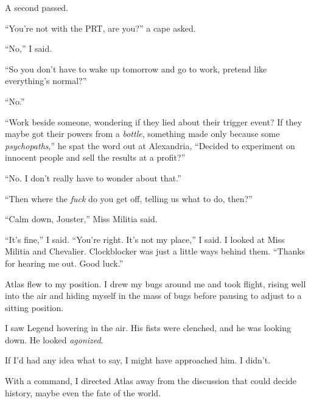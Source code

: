 A second passed.



``You're not with the PRT, are you?'' a cape asked.



``No,'' I said.



``So you don't have to wake up tomorrow and go to work, pretend like everything's normal?''



``No.''



``Work beside someone, wondering if they lied about their trigger event?  If they maybe got their powers from a \emph{bottle}, something made only because some \emph{psychopaths},'' he spat the word out at Alexandria, ``Decided to experiment on innocent people and sell the results at a profit?''



``No.  I don't really have to wonder about that.''



``Then where the \emph{fuck} do you get off, telling us what to do, then?''



``Calm down, Jouster,'' Miss Militia said.



``It's fine,'' I said.  ``You're right.  It's not my place,'' I said.  I looked at Miss Militia and Chevalier.  Clockblocker was just a little ways behind them.  ``Thanks for hearing me out.  Good luck.''



Atlas flew to my position.  I drew my bugs around me and took flight, rising well into the air and hiding myself in the mass of bugs before pausing to adjust to a sitting position.



I saw Legend hovering in the air.  His fists were clenched, and he was looking down.  He looked \emph{agonized}.



If I'd had any idea what to say, I might have approached him.  I didn't.



With a command, I directed Atlas away from the discussion that could decide history, maybe even the fate of the world.



\blacksquare



